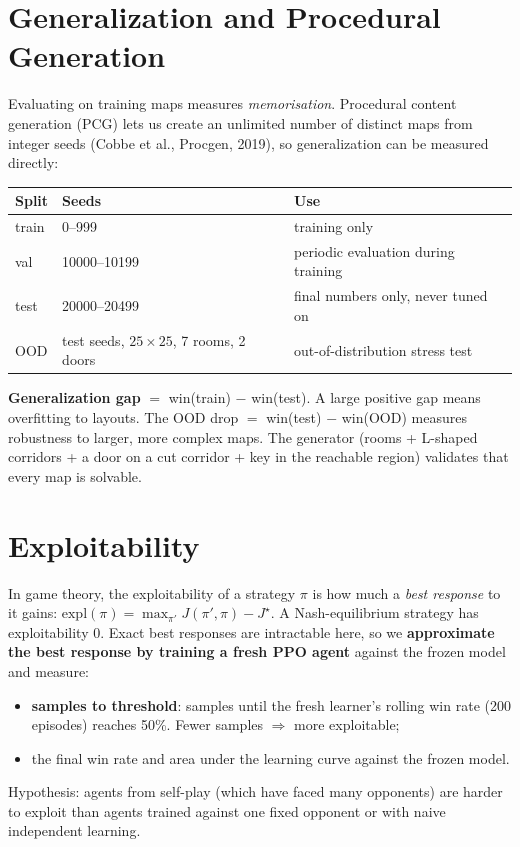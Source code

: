 \documentclass[11pt,a4paper]{article}
\begin{document}
\section{Generalization and Procedural Generation}
Evaluating on training maps measures \emph{memorisation}. Procedural content generation (PCG)
lets us create an unlimited number of distinct maps from integer seeds (Cobbe et al., Procgen, 2019),
so generalization can be measured directly:
\begin{center}
\begin{tabular}{lll}
\toprule
Split & Seeds & Use\\
\midrule
train & 0--999 & training only\\
val & 10000--10199 & periodic evaluation during training\\
test & 20000--20499 & final numbers only, never tuned on\\
OOD & test seeds, $25\times25$, 7 rooms, 2 doors & out-of-distribution stress test\\
\bottomrule
\end{tabular}
\end{center}
\textbf{Generalization gap} $=$ win(train) $-$ win(test). A large positive gap means overfitting to
layouts. The OOD drop $=$ win(test) $-$ win(OOD) measures robustness to larger, more complex maps.
The generator (rooms + L-shaped corridors + a door on a cut corridor + key in the reachable region)
validates that every map is solvable.

\section{Exploitability}
In game theory, the exploitability of a strategy $\pi$ is how much a \emph{best response} to it
gains: $\text{expl}(\pi)=\max_{\pi'}J(\pi',\pi)-J^\star$. A Nash-equilibrium strategy has
exploitability 0. Exact best responses are intractable here, so we \textbf{approximate the best
response by training a fresh PPO agent} against the frozen model and measure:
\begin{itemize}
  \item \textbf{samples to threshold}: samples until the fresh learner's rolling win rate (200 episodes)
        reaches 50\%. Fewer samples $\Rightarrow$ more exploitable;
  \item the final win rate and area under the learning curve against the frozen model.
\end{itemize}
Hypothesis: agents from self-play (which have faced many opponents) are harder to exploit than
agents trained against one fixed opponent or with naive independent learning.
\end{document}
